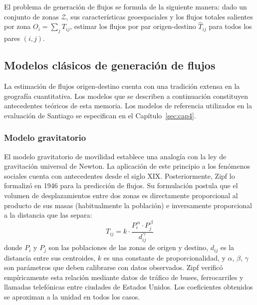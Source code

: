 El problema de generación de flujos se formula de la siguiente manera: dado un conjunto de zonas $\mathcal{Z}$, sus características geoespaciales y los flujos totales salientes por zona $O_i = \sum_j T_{ij}$, estimar los flujos por par origen-destino $\hat{T}_{ij}$ para todos los pares $(i, j)$.

\subsection{Modelos clásicos de generación de flujos}

La estimación de flujos origen-destino cuenta con una tradición extensa en la geografía cuantitativa. Los modelos que se describen a continuación constituyen antecedentes teóricos de esta memoria. Los modelos de referencia utilizados en la evaluación de Santiago se especifican en el Capítulo~\ref{sec:cap4}.

\subsubsection{Modelo gravitatorio}

El modelo gravitatorio de movilidad establece una analogía con la ley de gravitación universal de Newton. La aplicación de este principio a los fenómenos sociales cuenta con antecedentes desde el siglo XIX. Posteriormente, Zipf \cite{zipf1946p} lo formalizó en 1946 para la predicción de flujos. Su formulación postula que el volumen de desplazamientos entre dos zonas es directamente proporcional al producto de sus masas (habitualmente la población) e inversamente proporcional a la distancia que las separa:
\begin{equation}
    T_{ij} = k \cdot \frac{P_i^{\,\alpha} \cdot P_j^{\,\beta}}{d_{ij}^{\,\gamma}}
    \label{eq:gravedad}
\end{equation}
donde $P_i$ y $P_j$ son las poblaciones de las zonas de origen y destino, $d_{ij}$ es la distancia entre sus centroides, $k$ es una constante de proporcionalidad, y $\alpha$, $\beta$, $\gamma$ son parámetros que deben calibrarse con datos observados. Zipf verificó empíricamente esta relación mediante datos de tráfico de buses, ferrocarriles y llamadas telefónicas entre ciudades de Estados Unidos. Los coeficientes obtenidos se aproximan a la unidad en todos los casos.

